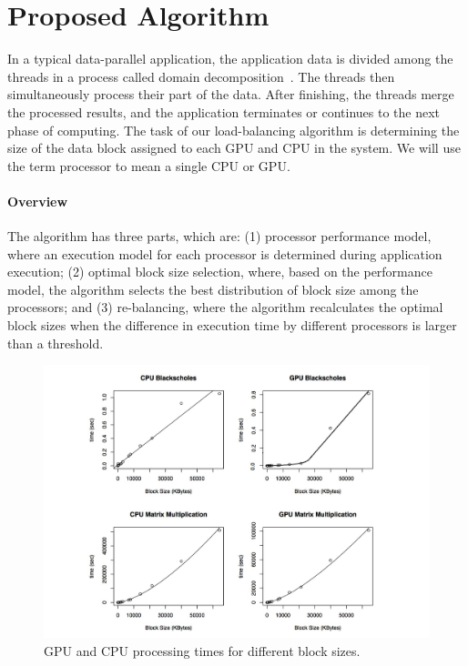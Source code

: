 \documentclass[journal]{IEEEtran}
\begin{document}
\section{Proposed Algorithm}

In a typical data-parallel application, the application data
is divided among the threads in a process called domain
decomposition~\cite{Gropp:1992uq}. The threads then simultaneously process their
part of the data. After finishing, the threads merge the processed results, and
the application terminates or continues to the next phase of computing. The task
of our load-balancing algorithm is determining the size of the data block
assigned to each GPU and CPU in the system. We will use the term processor to
mean a single CPU or GPU.

\vspace{0.2cm}
\paragraph*{Overview} The algorithm has three parts, which are: (1) processor 
performance model, where an execution model for each processor is determined
during application execution; (2) optimal block size selection, where, based on
the performance model, the algorithm selects the best distribution of block size
among the processors; and (3) re-balancing, where the algorithm recalculates the
optimal block sizes when the difference in execution time by different
processors is larger than a threshold.

\begin{figure}[!t]
	\centering
			\includegraphics[scale=0.36]{CPUVersusGPULinear2.pdf} 				
	\caption{GPU and CPU processing times for different block sizes.}
	\label{fig: CPUVersusGPU1}
\end{figure}
\end{document}
